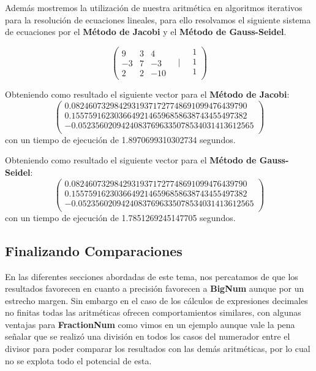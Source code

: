 \documentclass[a4paper,10pt,twocolumn]{article}
\begin{document}
Además mostremos la utilización de nuestra aritmética en algoritmos iterativos para la resolución de ecuaciones lineales, para ello resolvamos el siguiente sistema de ecuaciones por el \textbf{Método de Jacobi} y el \textbf{Método de Gauss-Seidel}.

\begin{equation}	
	\left(	
	\begin{matrix}
		9  & 3 & 4     \\
		-3 & 7 & -3    \\
		2  & 2 & -10 
	\end{matrix}
	\quad\Bigg|\quad
	\begin{matrix}
		1 \\
		1 \\
		1 \\
	\end{matrix}
	\right)
\end{equation}

Obteniendo como resultado el siguiente vector para el \textbf{Método de Jacobi}:
$$	
	\left(
	\begin{matrix}
			0.08246073298429319371727748691099476439790 \\ 								0.15575916230366492146596858638743455497382\\ 								-0.05235602094240837696335078534031413612565\\
		\end{matrix}
	\right)
$$ con un tiempo de ejecución de 1.8970699310302734 segundos.

Obteniendo como resultado el siguiente vector para el \textbf{Método de Gauss-Seidel}:
$$	
	\left(
	\begin{matrix}
			0.08246073298429319371727748691099476439790 \\ 								0.15575916230366492146596858638743455497382\\ 								-0.05235602094240837696335078534031413612565\\
		\end{matrix}
	\right)
$$ con un tiempo de ejecución de 1.7851269245147705 segundos.

\subsection{Finalizando Comparaciones}\label{sub:big}
En las diferentes secciones abordadas de este tema, nos percatamos de que los resultados favorecen en cuanto a precisión favorecen a \textbf{BigNum} aunque por un estrecho margen. Sin embargo en el caso de los cálculos de expresiones decimales no finitas todas las aritméticas ofrecen comportamientos similares, con algunas ventajas para \textbf{FractionNum} como vimos en un ejemplo aunque vale la pena señalar que se realizó una división en todos los casos del numerador entre el divisor para poder comparar los resultados con las demás aritméticas, por lo cual no se explota todo el potencial de esta.
\end{document}
